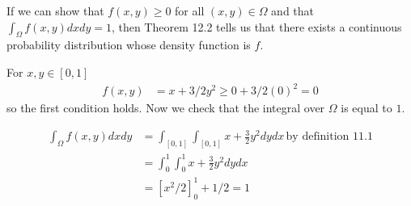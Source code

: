 
If we can show that $ f(x,y) \geq 0$ for all $ (x,y) \in \Omega$ and that $ \int_{\Omega}^{} f(x,y)
dx dy = 1$, then Theorem 12.2 tells us that there exists a continuous probability distribution whose
density function is $ f$.

For $ x,y \in [0,1]$
\begin{align*}
    f(x,y) &= x + 3/2 y^2 \geq 0 + 3/2 (0)^2 = 0 
\end{align*}
so the first condition holds. Now we check that the integral over $ \Omega$ is equal to $ 1$.

\begin{align*}
    \int_{\Omega}^{} f(x,y) dx dy &= \int_{[0,1]}^{} \int_{[0,1]}^{} x + \frac{3}{2} y^2 dy dx \,
    \mbox{by definition 11.1} \\
				  &= \int_{0}^{1} \int_{0}^{1} x + \frac{3}{2} y^2 dy dx\\
				  &= [x^2/2]_{0}^{1} + 1/2 = 1
\end{align*}
